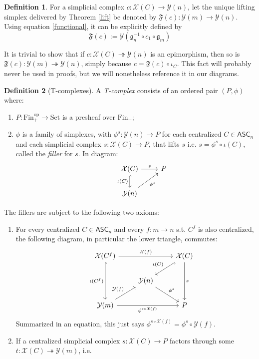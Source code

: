 \documentclass{article}
\theoremstyle{remark}
\theoremstyle{definition}
\newtheorem{definition}{Definition}[subsection]
\newcommand{\Fin}{\mathrm{Fin}}
\newcommand{\Set}{\mathrm{Set}}
\newcommand{\op}{\mathrm{op}}
\newcommand{\ASC}{\mathsf{ASC}}
\newcommand{\Y}{\mathcal Y}
\newcommand{\X}{\mathcal X}
\newcommand{\g}{\mathfrak g}
\newcommand{\F}{\mathfrak F}
\begin{document}
	\begin{definition}
		For a simplicial complex $c:\X(C)\to\Y(n)$, let the unique lifting simplex delivered by Theorem \ref{lift} be denoted by $\F(c):\Y(m)\to\Y(n)$. Using equation \ref{functional}, it can be explicitly defined by
		\[\F(c):=\Y(\g_n^{-1}\circ c_1\circ\g_m)\]
	\end{definition}
	It is trivial to show that if $c:\X(C)\twoheadrightarrow\Y(n)$ is an epimorphism, then so is $\F(c):\Y(m)\twoheadrightarrow\Y(n)$, simply because $c=\F(c)\circ\iota_C$. This fact will probably never be used in proofs, but we will nonetheless reference it in our diagrams.
	\begin{definition}[T-complexes]\label{TComp}
		A \textit{T-complex} consists of an ordered pair $(P,\phi)$ where:
		\begin{enumerate}
			\item $P:\Fin_+^\op\to\Set$ is a presheaf over $\Fin_+$;
			\item $\phi$ is a family of simplexes, with $\phi^s:\Y(n)\to P$ for each centralized $C\in\ASC_n$ and each simplicial complex $s:\X(C)\to P$, that lifts $s$ i.e. $s=\phi^s\circ\iota(C)$, called the \textit{filler} for $s$. In diagram:
			\[\begin{tikzcd}
				&\X(C)\arrow{r}{s}\arrow[hook]{d}[swap]{\iota(C)}&P\\
				&\Y(n)\arrow{ur}[swap]{\phi^s}
			\end{tikzcd}\]
		\end{enumerate}
		The fillers are subject to the following two axioms:
		\begin{enumerate}
			\item For every centralized $C\in\ASC_n$ and every $f:m\to n$ s.t. $C^f$ is also centralized, the following diagram, in particular the lower triangle, commutes:
			\begin{equation}\label{pullbackcomp}\begin{tikzcd}
				&\X(C^f)\arrow[hook]{dd}[swap]{\iota(C^f)}\arrow{rr}{\X(f)}&&\X(C)\arrow[hook]{ld}[swap]{\iota(C)}\arrow{dd}{s}\\
				&&\Y(n)\arrow{dr}{\phi^s}\\
				&\Y(m)\arrow{ur}{\Y(f)}\arrow{rr}[swap]{\phi^{s\circ\X(f)}}&&P
			\end{tikzcd}\end{equation}
			Summarized in an equation, this just says $\phi^{s\circ\X(f)}=\phi^s\circ\Y(f)$.
			\item If a centralized simplicial complex $s:\X(C)\to P$ factors through some $t:\X(C)\twoheadrightarrow\Y(m)$, i.e.

\end{enumerate}
\end{definition}
\end{document}
